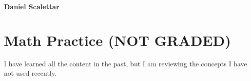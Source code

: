 \documentclass[fleqn]{article}
\begin{document}

\begin{center}
	\textbf{Daniel Scalettar}
\end{center}

\section{ Math Practice (NOT GRADED)}

I have learned all the content in the past, but I am reviewing the concepts I have not used recently.
\end{document}
